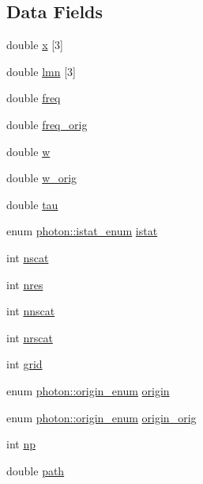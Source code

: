 \subsection*{Data Fields}
\begin{DoxyCompactItemize}
\item 
double \hyperlink{structphoton_a279232990e041c1535ce72fdd34c359d}{x} \mbox{[}3\mbox{]}
\item 
double \hyperlink{structphoton_a1166dfb4c725aac37dafe72bcf1aec2b}{lmn} \mbox{[}3\mbox{]}
\item 
double \hyperlink{structphoton_a98c6d400814a43aeda7d7fd1ed2d7dc6}{freq}
\item 
double \hyperlink{structphoton_a9ee01f91734c2f53894f62d76c2eafa8}{freq\+\_\+orig}
\item 
double \hyperlink{structphoton_a5fa87a07a9ceef33dd79aa5cdd7856cb}{w}
\item 
double \hyperlink{structphoton_a08790ef51ec6cc5d192173396080c9d9}{w\+\_\+orig}
\item 
double \hyperlink{structphoton_ae42fbabbb99b92586f81ee793288ff35}{tau}
\item 
enum \hyperlink{structphoton_ae56bb7ca587dc91f44d8c72a6a571f45}{photon\+::istat\+\_\+enum} \hyperlink{structphoton_adf0be64e948d68d787555681d15e13e2}{istat}
\item 
int \hyperlink{structphoton_af295c65faf17c8e83c2547a95509e665}{nscat}
\item 
int \hyperlink{structphoton_ad91ab6667b2f4635925deb64ea7841bd}{nres}
\item 
int \hyperlink{structphoton_a31ff1fe2cb5835980637f0cf4ab61ffc}{nnscat}
\item 
int \hyperlink{structphoton_a96a247f2621b88fe5313dbfdeca7d37f}{nrscat}
\item 
int \hyperlink{structphoton_a2aa9d1ea7afffe4f370b28b0a21d6c79}{grid}
\item 
enum \hyperlink{structphoton_a6e3512103ffd5c0d6004cd432cdc4c3a}{photon\+::origin\+\_\+enum} \hyperlink{structphoton_a201206174a8fa79b29526a68e20704cf}{origin}
\item 
enum \hyperlink{structphoton_a6e3512103ffd5c0d6004cd432cdc4c3a}{photon\+::origin\+\_\+enum} \hyperlink{structphoton_a1b0fcf48345bbe1f6bc480294b054850}{origin\+\_\+orig}
\item 
int \hyperlink{structphoton_ac6a38267c9cc04060e249c1cbaad3d9a}{np}
\item 
double \hyperlink{structphoton_a3029350c63c7c27314adca143458c4ed}{path}
\end{DoxyCompactItemize}


